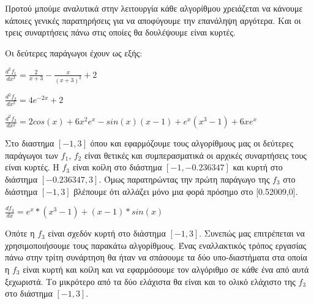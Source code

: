 Προτού μπούμε αναλυτικά στην λειτουργία κάθε αλγορίθμου χρειάζεται να κάνουμε κάποιες γενικές
παρατηρήσεις για να αποφύγουμε την επανάληψη αργότερα. Και οι τρεις συναρτήσεις πάνω στις οποίες
θα δουλέψουμε είναι κυρτές. 

Οι δεύτερες παράγωγοι έχουν ως εξής:

$\frac{d^2f_1}{dx^2} = \frac{2}{x + 3} - \frac{x}{(x + 3)^2} + 2$

$\frac{d^2f_2}{dx^2} = 4e^{-2x} + 2$

$\frac{d^2f_3}{dx^2} = 2cos(x) + 6x^2e^{x} - sin(x)(x - 1) + e^{x}(x^3 - 1) + 6xe^{x}$

Στο διαστημα $[-1,3]$ όπου και εφαρμόζουμε τους αλγορίθμους μας οι δεύτερες παράγωγοι των $f_1$, $f_2$ είναι
θετικές και συμπερασματικά οι αρχικές συναρτήσεις τους είναι κυρτές. Η $f_3$ είναι κοίλη στο διάστημα
$[-1,-0.236347]$ και κυρτή στο διάστημα $[-0.236347,3]$. Όμως παρατηρώντας την πρώτη παράγωγο της
$f_3$ στο διάστημα $[-1,3]$ βλέπουμε ότι αλλάζει μόνο μια φορά πρόσημο στο [0.52009,0].

$\frac{df_3}{dx} = e^x * (x^3 - 1) + (x - 1) * sin(x)$

Οπότε η $f_3$ είναι σχεδόν κυρτή στο διάστημα $[-1,3]$. Συνεπώς μας επιτρέπεται να χρησιμοποιήσουμε τους
παρακάτω αλγορίθμους. Ένας εναλλακτικός τρόπος εργασίας πάνω στην τρίτη συνάρτηση θα ήταν να σπάσουμε
τα δύο υπο-διαστήματα στα οποία η $f_3$ είναι κυρτή και κοίλη και να εφαρμόσουμε τον αλγόριθμο σε κάθε
ένα από αυτά ξεχωριστά. Το μικρότερο από τα δύο ελάχιστα θα είναι και το ολικό ελάχιστο της $f_3$ στο 
διάστημα $[-1,3]$.
